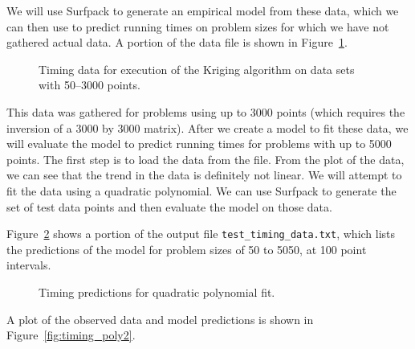 \documentclass{article}
\begin{document}
We will use Surfpack to generate an empirical model from these data, which we
can then use to predict running times on problem sizes for which we have not
gathered actual data.  A portion of the data file is shown in Figure~\ref{fig:timing_data_extract}.

\begin{figure}[htbp]
  \centering
  \begin{bigbox}
	\begin{small}
		
 	\end{small}
  \end{bigbox}
  \label{fig:timing_data_extract}
  \caption{ Timing data for execution of the Kriging algorithm on data sets with 50--3000 points.}
\end{figure}

This data was gathered for problems using up to 3000 points (which requires the
inversion of a 3000 by 3000 matrix).  After we create a model to fit these data,
we will evaluate the model to predict running times for problems with up to 5000
points.  The first step is to load the data from the file.
From the plot of the data, we can see that the trend in the data is definitely
not linear.  We will attempt to fit the data using a quadratic polynomial.
We can use Surfpack to generate the set of test data points and then evaluate
the model on those data.


Figure~\ref{fig:test_data_extract} shows a portion of the output file \texttt{test\_timing\_data.txt}, which
lists the predictions of the model for problem sizes of 50 to 5050, at 100 point
intervals.
\begin{figure}[htbp]
  \centering
  \begin{bigbox}
	\begin{small}
 	\end{small}
  \end{bigbox}
  \label{fig:test_data_extract}
  \caption{Timing predictions for quadratic polynomial fit.}
\end{figure}
A plot of the observed data and model predictions is shown in Figure~\ref{fig:timing_poly2}.
\end{document}
